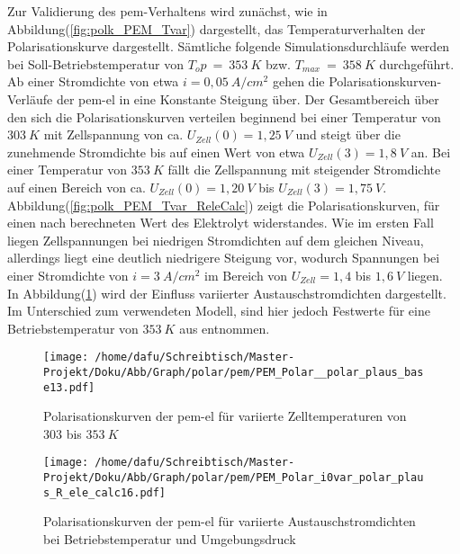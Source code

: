 \documentclass[onecolumn,10pt,titlepage]{article}
\begin{document}


Zur Validierung des \gls{pem}-Verhaltens wird zunächst, wie in Abbildung(\ref{fig:polk_PEM_Tvar}) dargestellt, das Temperaturverhalten der Polarisationskurve dargestellt.
%
Sämtliche folgende Simulationsdurchläufe werden bei Soll-Betriebstemperatur von $T_op~=~353~K$ bzw. $T_{max} ~=~ 358~K$ durchgeführt.\\
Ab einer Stromdichte von etwa $i=0,05~A/cm^2$ gehen die Polarisationskurven-Verläufe der \gls{pem}-\gls{el} in eine Konstante Steigung über. Der Gesamtbereich über den sich die Polarisationskurven verteilen beginnend bei einer Temperatur von $303~K$ mit Zellspannung von ca. $U_{Zell}(0)=1,25~V$ und steigt über die zunehmende Stromdichte bis auf einen Wert von etwa $U_{Zell}(3)=1,8~V$ an. Bei einer Temperatur von $353~K$ fällt die Zellspannung mit steigender Stromdichte auf einen Bereich von ca. $U_{Zell}(0)=1,20~V$ bis $U_{Zell}(3)=1,75~V$.\\
 Abbildung(\ref{fig:polk_PEM_Tvar_ReleCalc}) zeigt die Polarisationskurven, für einen nach \cite{Chandesris2015} berechneten Wert des Elektrolyt
widerstandes. Wie im ersten Fall liegen Zellspannungen bei niedrigen Stromdichten auf dem gleichen Niveau, allerdings liegt eine deutlich niedrigere Steigung vor, wodurch Spannungen bei einer Stromdichte von $i=3~A/cm^2$ im Bereich von $U_{Zell}=1,4$ bis $1,6~V$ liegen.\\
In Abbildung(\ref{fig:polk_PEM_i0var}) wird der Einfluss variierter Austauschstromdichten dargestellt. Im Unterschied zum verwendeten Modell, sind hier jedoch Festwerte für eine Betriebstemperatur von $353~K$ aus \cite{Espinosa-Lopez2018} entnommen.
\begin{figure}[!tbp]
	\centering
	\begin{minipage}[t]{0.49\textwidth}
		\texttt{[image: /home/dafu/Schreibtisch/Master-Projekt/Doku/Abb/Graph/polar/pem/PEM\_Polar\_\_polar\_plaus\_base13.pdf]}

		\caption[Polarisationskurven der \gls{pem}-\gls{el} für variierte Betriebstemperaturen]{Polarisationskurven der \gls{pem}-\gls{el} für variierte Zelltemperaturen von $303$ bis $353~K$}
		\label{fig:polk_PEM_Tvar}
	\end{minipage}
	\hfill
	\begin{minipage}[t]{0.49\textwidth}
		\texttt{[image: /home/dafu/Schreibtisch/Master-Projekt/Doku/Abb/Graph/polar/pem/PEM\_Polar\_i0var\_polar\_plaus\_R\_ele\_calc16.pdf]}
		\caption[Polarisationskurven der \gls{pem}-\gls{el} für variierte Austauschstromdichten]{Polarisationskurven der \gls{pem}-\gls{el} für variierte Austauschstromdichten bei Betriebstemperatur und Umgebungsdruck}
		\label{fig:polk_PEM_i0var}
	\end{minipage}
\end{figure}
\end{document}
